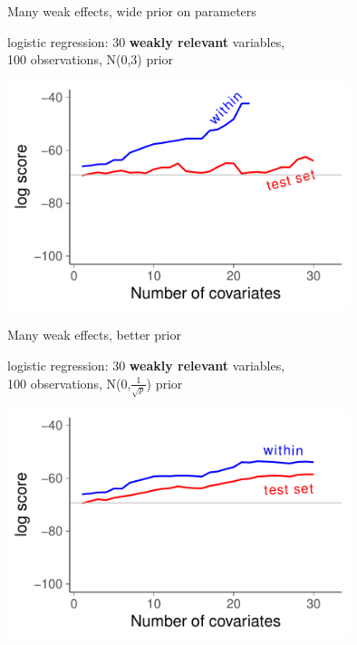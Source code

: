 \documentclass[english,t]{beamer}
\begin{document}
\begin{frame}{Many weak effects, wide prior on parameters}

  logistic regression: 30 \textbf{weakly relevant} variables, \\100
  observations, N(0,3) prior
  
  {\includegraphics[width=10cm]{weak_N.pdf}}

\end{frame}

\begin{frame}{Many weak effects, better prior}

  logistic regression: 30 \textbf{weakly relevant} variables, \\100
  observations, N(0,$\frac{1}{\sqrt{p}}$) prior
  
  {\includegraphics[width=10cm]{weak_Ns.pdf}}

\end{frame}
\end{document}
